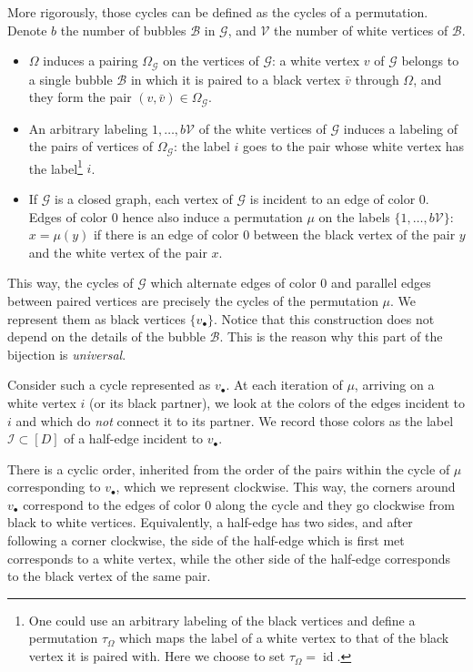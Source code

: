 \documentclass[aps,prd,10pt,notitlepage,nofootinbib,superscriptaddress,showkeys,showpacs]{revtex4-1}
\begin{document}
More rigorously, those cycles can be defined as the cycles of a permutation. Denote $b$ the number of bubbles ${\mathcal{B}}$ in ${\mathcal{G}}$, and ${\mathcal{V}}$ the number of white vertices of ${\mathcal{B}}$.
\begin{itemize}
\item $\Omega$ induces a pairing $\Omega_{\mathcal{G}}$ on the vertices of ${\mathcal{G}}$: a white vertex $v$ of ${\mathcal{G}}$ belongs to a single bubble ${\mathcal{B}}$ in which it is paired to a black vertex $\bar{v}$ through $\Omega$, and they form the pair $(v, \bar{v})\in \Omega_{\mathcal{G}}$.
\item An arbitrary labeling $1, \dotsc, b{\mathcal{V}}$ of the white vertices of ${\mathcal{G}}$ induces a labeling of the pairs of vertices of $\Omega_{\mathcal{G}}$: the label $i$ goes to the pair whose white vertex has the label\footnote{One could use an arbitrary labeling of the black vertices and define a permutation $\tau_\Omega$ which maps the label of a white vertex to that of the black vertex it is paired with. Here we choose to set $\tau_\Omega = \operatorname{id}$.} $i$.
\item If ${\mathcal{G}}$ is a closed graph, each vertex of ${\mathcal{G}}$ is incident to an edge of color 0. Edges of color $0$ hence also induce a permutation $\mu$ on the labels $\{1,\dotsc,b{\mathcal{V}}\}$: $x = \mu(y)$ if there is an edge of color 0 between the black vertex of the pair $y$ and the white vertex of the pair $x$.
\end{itemize}
This way, the cycles of ${\mathcal{G}}$ which alternate edges of color 0 and parallel edges between paired vertices are precisely the cycles of the permutation $\mu$. We represent them as black vertices $\{v_\bullet\}$. Notice that this construction does not depend on the details of the bubble ${\mathcal{B}}$. This is the reason why this part of the bijection is \emph{universal}.

Consider such a cycle represented as $v_\bullet$. At each iteration of $\mu$, arriving on a white vertex $i$ (or its black partner), we look at the colors of the edges incident to $i$ and which do \emph{not} connect it to its partner. We record those colors as the label ${\mathcal{I}}\subset [D]$ of a half-edge incident to $v_\bullet$.

There is a cyclic order, inherited from the order of the pairs within the cycle of $\mu$ corresponding to $v_\bullet$, which we represent clockwise. This way, the corners around $v_\bullet$ correspond to the edges of color 0 along the cycle and they go clockwise from black to white vertices. Equivalently, a half-edge has two sides, and after following a corner clockwise, the side of the half-edge which is first met corresponds to a white vertex, while the other side of the half-edge corresponds to the black vertex of the same pair.
\end{document}
